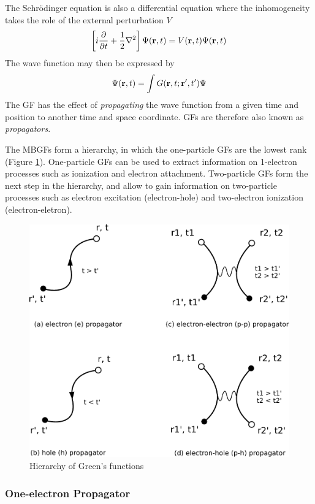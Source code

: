 The Schrödinger equation is also a differential equation where the inhomogeneity takes the role of the external perturbation $V$
\begin{equation}
\left[ i\frac{\partial}{\partial t} + \frac{1}{2} \nabla^2 \right] \Psi(\mathbf{r},t) = V(\mathbf{r},t) \Psi(\mathbf{r},t)
\end{equation}
\noindent The wave function may then be expressed by
\begin{equation}
\Psi(\mathbf{r},t) = \int G(\mathbf{r},t;\mathbf{r}',t') \Psi
\end{equation}
\noindent The GF has the effect of \emph{propagating} the wave function from a given time and position to another time and space coordinate. GFs are therefore also known as \emph{propagators}.

The MBGFs form a hierarchy, in which the one-particle GFs are the lowest rank (Figure \ref{fig:PROP}). One-particle GFs can be used to extract information on 1-electron processes such as ionization and electron attachment. Two-particle GFs form the next step in the hierarchy, and allow to gain information on two-particle processes such as electron excitation (electron-hole) and two-electron ionization (electron-eletron). 
\begin{figure}
\centering
\includegraphics[scale=0.6]{Pics/PROP}
\caption{Hierarchy of Green's functions}
\label{fig:PROP}
\end{figure}

\subsubsection{One-electron Propagator}

